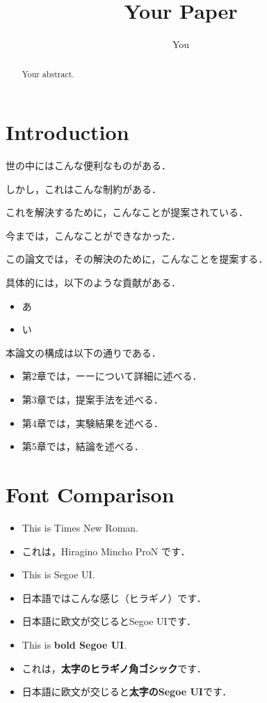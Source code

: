 \documentclass[twocolumn]{ltjsarticle}
\title{Your Paper}
\author{You}
\begin{document}
\maketitle

\begin{abstract}
      Your abstract.
\end{abstract}

\section{Introduction}

      世の中にはこんな便利なものがある．

      しかし，これはこんな制約がある．

      これを解決するために，こんなことが提案されている．

      今までは，こんなことができなかった．

      この論文では，その解決のために，こんなことを提案する．

      具体的には，以下のような貢献がある．
      \begin{itemize}
            \item あ
            \item い
      \end{itemize}

      本論文の構成は以下の通りである．
      \begin{itemize}
            \item 第2章では，ーーについて詳細に述べる．
            \item 第3章では，提案手法を述べる．
            \item 第4章では，実験結果を述べる．
            \item 第5章では，結論を述べる．
      \end{itemize}
      
\section{Font Comparison}

      \begin{itemize}
            \item This is Times New Roman.
            \item これは，Hiragino Mincho ProN です．
            \item This is \textsf{Segoe UI}.
            \item 日本語では\textsf{こんな感じ（ヒラギノ）}です．
            \item 日本語に欧文が交じると\textsf{Segoe UI}です．
            \item This is \textbf{bold Segoe UI}.
            \item これは，\textbf{太字のヒラギノ角ゴシック}です．
            \item 日本語に欧文が交じると\textbf{太字のSegoe UI}です．
      \end{itemize}
\end{document}
